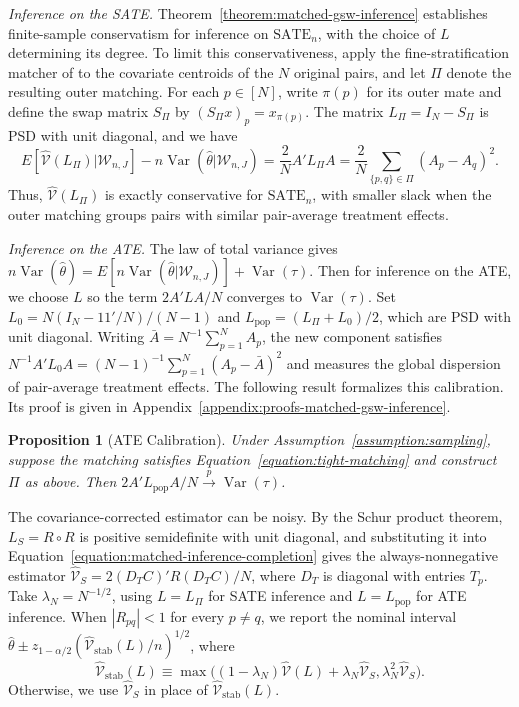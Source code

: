 \documentclass[letterpaper,12pt]{article}
\newtheorem{prop}[thm]{Proposition}
\theoremstyle{definition}
\numberwithin{equation}{section}
\newcommand{\mc}{\mathcal}
\newcommand{\SATE}{\mathrm{SATE}}
\newcommand{\convp}{\overset{p}{\to}}
\newcommand{\E}{E}
\DeclareMathOperator{\var}{Var}
\begin{document}
\emph{Inference on the SATE.}
Theorem~\ref{theorem:matched-gsw-inference} establishes finite-sample conservatism for inference on $\SATE_n$, with the choice of $L$ determining its degree.
To limit this conservativeness, apply the fine-stratification matcher of \citet{cytrynbaum2022local} to the covariate centroids of the $N$ original pairs, and let $\Pi$ denote the resulting outer matching.
For each $p\in[N]$, write $\pi(p)$ for its outer mate and define the swap matrix $S_\Pi$ by $(S_\Pi x)_p=x_{\pi(p)}$.
The matrix $L_\Pi=I_N-S_\Pi$ is PSD with unit diagonal, and we have
\begin{equation}\label{equation:matched-inference-sate-slack}
\E[\widehat{\mc V}(L_\Pi)|\mathcal W_{n,J}]-n\var(\widehat\theta|\mathcal W_{n,J})=\frac2NA'L_\Pi A=\frac2N\sum_{\{p,q\}\in\Pi}(A_p-A_q)^2.
\end{equation}
Thus, $\widehat{\mc V}(L_\Pi)$ is exactly conservative for $\SATE_n$, with smaller slack when the outer matching groups pairs with similar pair-average treatment effects.

\medskip
\emph{Inference on the ATE.}
The law of total variance gives $n\var(\widehat\theta)=\E[n\var(\widehat\theta|\mathcal W_{n,J})]+\var(\tau)$.
Then for inference on the ATE, we choose $L$ so the term $2A'LA/N$ converges to $\var(\tau)$.
Set $L_0=N(I_N-11'/N)/(N-1)$ and $L_{\mathrm{pop}}=(L_\Pi+L_0)/2$, which are PSD with unit diagonal.
Writing $\bar A=N^{-1}\sum_{p=1}^NA_p$, the new component satisfies $N^{-1}A'L_0A=(N-1)^{-1}\sum_{p=1}^N(A_p-\bar A)^2$ and measures the global dispersion of pair-average treatment effects.
The following result formalizes this calibration.
Its proof is given in Appendix~\ref{appendix:proofs-matched-gsw-inference}.

\begin{prop}[ATE Calibration]\label{theorem:matched-gsw-ate-calibration}
Under Assumption~\ref{assumption:sampling}, suppose the matching satisfies Equation~\eqref{equation:tight-matching} and construct $\Pi$ as above.
Then $2A'L_{\mathrm{pop}}A/N\convp\var(\tau)$.
\end{prop}

The covariance-corrected estimator can be noisy.
By the Schur product theorem, $L_S=R\circ R$ is positive semidefinite with unit diagonal, and substituting it into Equation~\eqref{equation:matched-inference-completion} gives the always-nonnegative estimator $\widehat{\mc V}_S=2(D_TC)'R(D_TC)/N$, where $D_T$ is diagonal with entries $T_p$.
Take $\lambda_N=N^{-1/2}$, using $L=L_\Pi$ for SATE inference and $L=L_{\mathrm{pop}}$ for ATE inference.
When $|R_{pq}|<1$ for every $p\neq q$, we report the nominal interval $\widehat\theta\pm z_{1-\alpha/2}(\widehat{\mc V}_{\mathrm{stab}}(L)/n)^{1/2}$, where
\begin{equation}\label{equation:matched-inference-stabilized}
\widehat{\mc V}_{\mathrm{stab}}(L)\equiv\max\bigl((1-\lambda_N)\widehat{\mc V}(L)+\lambda_N\widehat{\mc V}_S,\lambda_N^2\widehat{\mc V}_S\bigr).
\end{equation}
Otherwise, we use $\widehat{\mc V}_S$ in place of $\widehat{\mc V}_{\mathrm{stab}}(L)$.
\end{document}
